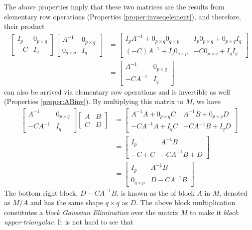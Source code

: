 The above properties imply that these two matrices are the results from elementary row operations (Properties \ref{proper:invseqelement}), and therefore, their product
\begin{align*}
\begin{bmatrix}
I_p & 0_{p \times q} \\
-C & I_q
\end{bmatrix}
\begin{bmatrix}
A^{-1} & 0_{p\times q} \\
0_{q\times p} & I_q
\end{bmatrix}
&=
\begin{bmatrix}
I_pA^{-1} + 0_{p\times q}0_{q\times p} & I_p0_{p\times q} + 0_{p\times q}I_q \\
(-C)A^{-1} + I_q0_{q \times p} & -C0_{p \times q} + I_qI_q
\end{bmatrix} \\
&=
\begin{bmatrix}
A^{-1} & 0_{p\times q} \\
-CA^{-1} & I_q
\end{bmatrix}
\end{align*}
can also be arrived via elementary row operations and is invertible as well (Properties \ref{proper:ABinv}). By multiplying this matrix to $M$, we have
\begin{align*}
\begin{bmatrix}
A^{-1} & 0_{p\times q} \\
-CA^{-1} & I_q
\end{bmatrix}
\begin{bmatrix}
A & B \\
C & D
\end{bmatrix} &= 
\begin{bmatrix}
A^{-1}A + 0_{p\times q}C & A^{-1}B + 0_{p \times q}D \\
-CA^{-1}A + I_qC & - CA^{-1}B + I_qD  
\end{bmatrix} \\
&= 
\begin{bmatrix}
I_p & A^{-1}B \\
-C + C & - CA^{-1}B + D  
\end{bmatrix} \\
&=
\begin{bmatrix}
I_p & A^{-1}B \\
0_{q\times p} & D - CA^{-1}B 
\end{bmatrix}
\end{align*}
The bottom right block, $D - CA^{-1}B$, is known as the  of block $A$ in $M$, denoted as $M/A$ and has the same shape $q \times q$ as $D$. The above block multiplication constitutes a \textit{block Gaussian Elimination} over the matrix $M$ to make it \textit{block upper-triangular}. It is not hard to see that
